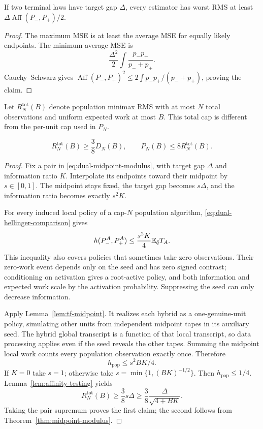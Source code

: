 \begin{lemma}\label{lem:affinity-testing}
If two terminal laws have target gap $\Delta$, every estimator has worst
RMS at least $\Delta\operatorname{Aff}(P_-,P_+)/2$.
\end{lemma}

\begin{proof}
The maximum MSE is at least the average MSE for equally likely endpoints.
The minimum average MSE is
\[
 \frac{\Delta^2}{2}\int\frac{p_-p_+}{p_-+p_+}.
\]
Cauchy--Schwarz gives
$\operatorname{Aff}(P_-,P_+)^2
\le2\int p_-p_+/(p_-+p_+)$, proving the claim.
\end{proof}

Let $R_N^{\mathrm{tot}}(B)$ denote population minimax RMS with at most
$N$ total observations and uniform expected work at most $B$. This total
cap is different from the per-unit cap used in $P_N$.

\begin{theorem}\label{thm:dual-adaptive}
\begin{equation}
 R_N^{\mathrm{tot}}(B)\ge\frac38D_N(B),\qquad
 P_N(B)\le8R_N^{\mathrm{tot}}(B).
 \label{eq:dual-capped-adaptive}
\end{equation}
\end{theorem}

\begin{proof}
Fix a pair in \eqref{eq:dual-midpoint-modulus}, with target gap $\Delta$
and information ratio $K$. Interpolate its endpoints toward their
midpoint by $s\in[0,1]$. The midpoint stays fixed, the target gap becomes
$s\Delta$, and the information ratio becomes exactly $s^2K$.

For every induced local policy of a cap-$N$ population algorithm,
\eqref{eq:dual-hellinger-comparison} gives
\[
 h(P_-^A,P_+^A)\le\frac{s^2K}{4}\mathbb E_{\bar q}T_A.
\]
This inequality also covers policies that sometimes take zero
observations. Their zero-work event depends only on the seed and has zero
signed contrast; conditioning on activation gives a root-active policy,
and both information and expected work scale by the activation
probability. Suppressing the seed can only decrease information.

Apply Lemma~\ref{lem:tf-midpoint}.
It realizes each hybrid as a one-genuine-unit policy, simulating other
units from independent midpoint tapes in its auxiliary seed. The hybrid
global transcript is a function of that local transcript, so data
processing applies even if the seed reveals the other tapes. Summing the
midpoint local work counts every population observation exactly once.
Therefore
\[
 h_{\mathrm{pop}}\le s^2BK/4.
\]
If $K=0$ take $s=1$; otherwise take $s=\min\{1,(BK)^{-1/2}\}$.
Then $h_{\mathrm{pop}}\le1/4$. Lemma~\ref{lem:affinity-testing} yields
\[
 R_N^{\mathrm{tot}}(B)\ge\frac38s\Delta
 \ge\frac38\frac\Delta{\sqrt{4+BK}}.
\]
Taking the pair supremum proves the first claim; the second follows from
Theorem~\ref{thm:midpoint-modulus}.
\end{proof}

